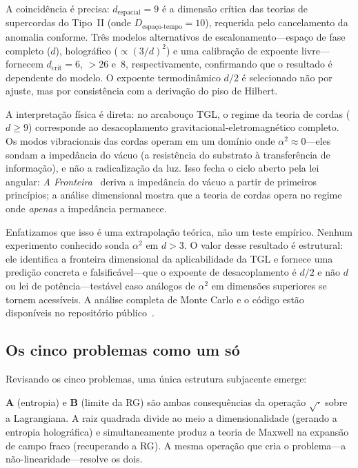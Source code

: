 \documentclass[12pt,a4paper,twocolumn]{article}
\begin{document}
A coincidência é precisa: $d_{\text{espacial}} = 9$ é a dimensão crítica das teorias de supercordas do Tipo~II (onde $D_{\text{espaço-tempo}} = 10$), requerida pelo cancelamento da anomalia conforme. Três modelos alternativos de escalonamento---espaço de fase completo ($d$), holográfico ($\propto (3/d)^2$) e uma calibração de expoente livre---fornecem $d_{\text{crit}} = 6$, $> 26$ e~$8$, respectivamente, confirmando que o resultado é dependente do modelo. O expoente termodinâmico $d/2$ é selecionado não por ajuste, mas por consistência com a derivação do piso de Hilbert.

A interpretação física é direta: no arcabouço TGL, o regime da teoria de cordas ($d \geq 9$) corresponde ao desacoplamento gravitacional-eletromagnético completo. Os modos vibracionais das cordas operam em um domínio onde $\alpha^2 \approx 0$---eles sondam a impedância do vácuo (a resistência do substrato à transferência de informação), e não a radicalização da luz. Isso fecha o ciclo aberto pela lei angular: \textit{A Fronteira}~\cite{Miguel2026Fronteira} deriva a impedância do vácuo a partir de primeiros princípios; a análise dimensional mostra que a teoria de cordas opera no regime onde \emph{apenas} a impedância permanece.

Enfatizamos que isso é uma extrapolação teórica, não um teste empírico. Nenhum experimento conhecido sonda $\alpha^2$ em $d > 3$. O valor desse resultado é estrutural: ele identifica a fronteira dimensional da aplicabilidade da TGL e fornece uma predição concreta e falsificável---que o expoente de desacoplamento é $d/2$ e não $d$ ou lei de potência---testável caso análogos de $\alpha^2$ em dimensões superiores se tornem acessíveis. A análise completa de Monte Carlo e o código estão disponíveis no repositório público~\cite{Miguel2026GitHub,Miguel2026DimCoupling}.

\subsection{Os cinco problemas como um só}
\label{sec:four_as_one}

Revisando os cinco problemas, uma única estrutura subjacente emerge:

\textbf{A} (entropia) e \textbf{B} (limite da RG) são ambas consequências da
operação $\sqrt{\cdot}$ sobre a Lagrangiana. A raiz quadrada divide ao meio
a dimensionalidade (gerando a entropia holográfica) e simultaneamente produz
a teoria de Maxwell na expansão de campo fraco (recuperando a RG). A mesma
operação que cria o problema---a não-linearidade---resolve os dois.
\end{document}
